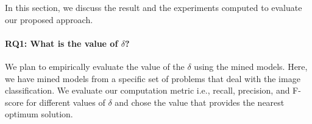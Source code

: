 %		
%
%
%

In this section, we discuss the result and the experiments computed to evaluate our proposed approach.
\paragraph{\textbf{RQ1: What is the value of $\delta$?}}
We plan to empirically evaluate the value of the $\delta$ using the mined models. Here, we have mined models from a specific set of problems that deal with the image classification. We evaluate our computation metric i.e., recall, precision, and F-score for different values of $\delta$ and chose the value that provides the nearest optimum solution.

